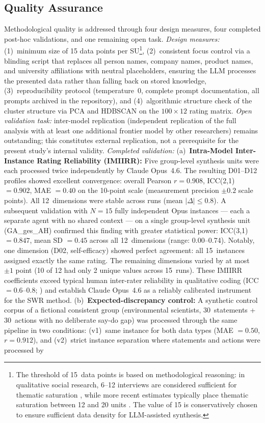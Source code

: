 \documentclass[12pt,a4paper]{article}
\begin{document}
\subsection{Quality Assurance}
\label{sec:methodik:qualitaet}

Methodological quality is addressed through four design measures, four completed post-hoc validations, and one remaining open task. \emph{Design measures:} (1)~minimum size of 15 data points per SU\footnote{The threshold of 15~data points is based on methodological reasoning: in qualitative social research, 6--12 interviews are considered sufficient for thematic saturation \citep{StraussCorbin1990}, while more recent estimates typically place thematic saturation between 12 and 20 units \citep{Guest2006, FugardPotts2015}. The value of 15 is conservatively chosen to ensure sufficient data density for LLM-assisted synthesis.}, (2)~consistent focus control via a blinding script that replaces all person names, company names, product names, and university affiliations with neutral placeholders, ensuring the LLM processes the presented data rather than falling back on stored knowledge, (3)~reproducibility protocol (temperature~0, complete prompt documentation, all prompts archived in the repository), and (4)~algorithmic structure check of the cluster structure via PCA and HDBSCAN on the $100 \times 12$ rating matrix. \emph{Open validation task:} inter-model replication (independent replication of the full analysis with at least one additional frontier model by other researchers) remains outstanding; this constitutes external replication, not a prerequisite for the present study's internal validity. \emph{Completed validation:} (a)~\textbf{Intra-Model Inter-Instance Rating Reliability (IMIIRR):} Five group-level synthesis units were each processed twice independently by Claude Opus~4.6. The resulting D01--D12 profiles showed excellent convergence: overall Pearson $r = 0.908$, ICC(2,1) $= 0.902$, MAE $= 0.40$ on the 10-point scale (measurement precision $\pm 0.2$ scale points). All 12~dimensions were stable across runs (mean $|\Delta| \leq 0.8$). A subsequent validation with $N = 15$ fully independent Opus instances --- each a separate agent with no shared context --- on a single group-level synthesis unit (GA\_ges\_AH) confirmed this finding with greater statistical power: ICC(3,1) $= 0.847$, mean SD $= 0.45$ across all 12~dimensions (range: 0.00--0.74). Notably, one dimension (D02, self-efficacy) showed perfect agreement: all 15~instances assigned exactly the same rating. The remaining dimensions varied by at most $\pm 1$ point (10 of 12 had only 2 unique values across 15~runs). These IMIIRR coefficients exceed typical human inter-rater reliability in qualitative coding (ICC $= 0.6$--$0.8$; \citealt{Hallgren2012}) and establish Claude Opus~4.6 as a reliably calibrated instrument for the SWR method. (b)~\textbf{Expected-discrepancy control:} A synthetic control corpus of a fictional consistent group (environmental scientists, 30~statements + 30~actions with no deliberate say-do gap) was processed through the same pipeline in two conditions: (v1)~same instance for both data types (MAE $= 0.50$, $r = 0.912$), and (v2)~strict instance separation where statements and actions were processed by 
\end{document}
